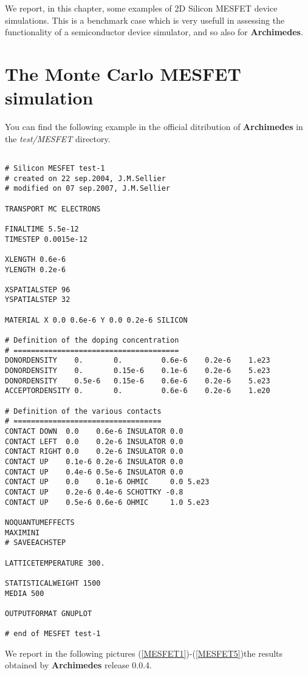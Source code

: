 \documentclass[12pt]{book}
\begin{document}
We report, in this chapter, some examples of 2D Silicon MESFET device simulations. This is a benchmark case which is very usefull in assessing the functionality of a semiconductor device simulator, and so also for \textbf{Archimedes}.\\

\section{The Monte Carlo MESFET simulation}

You can find the following example in the official ditribution of \textbf{Archimedes} in the \textsl{test/MESFET} directory.
\begin{verbatim}

# Silicon MESFET test-1
# created on 22 sep.2004, J.M.Sellier
# modified on 07 sep.2007, J.M.Sellier

TRANSPORT MC ELECTRONS

FINALTIME 5.5e-12
TIMESTEP 0.0015e-12

XLENGTH 0.6e-6
YLENGTH 0.2e-6

XSPATIALSTEP 96
YSPATIALSTEP 32

MATERIAL X 0.0 0.6e-6 Y 0.0 0.2e-6 SILICON

# Definition of the doping concentration
# ======================================
DONORDENSITY    0.       0.         0.6e-6    0.2e-6    1.e23
DONORDENSITY    0.       0.15e-6    0.1e-6    0.2e-6    5.e23
DONORDENSITY    0.5e-6   0.15e-6    0.6e-6    0.2e-6    5.e23
ACCEPTORDENSITY 0.       0.         0.6e-6    0.2e-6    1.e20

# Definition of the various contacts
# ==================================
CONTACT DOWN  0.0    0.6e-6 INSULATOR 0.0
CONTACT LEFT  0.0    0.2e-6 INSULATOR 0.0
CONTACT RIGHT 0.0    0.2e-6 INSULATOR 0.0
CONTACT UP    0.1e-6 0.2e-6 INSULATOR 0.0
CONTACT UP    0.4e-6 0.5e-6 INSULATOR 0.0
CONTACT UP    0.0    0.1e-6 OHMIC     0.0 5.e23
CONTACT UP    0.2e-6 0.4e-6 SCHOTTKY -0.8
CONTACT UP    0.5e-6 0.6e-6 OHMIC     1.0 5.e23

NOQUANTUMEFFECTS
MAXIMINI
# SAVEEACHSTEP

LATTICETEMPERATURE 300.

STATISTICALWEIGHT 1500
MEDIA 500

OUTPUTFORMAT GNUPLOT

# end of MESFET test-1

\end{verbatim}

We report in the following pictures (\ref{MESFET1})-(\ref{MESFET5})the results obtained by \textbf{Archimedes} release 0.0.4.
\end{document}
